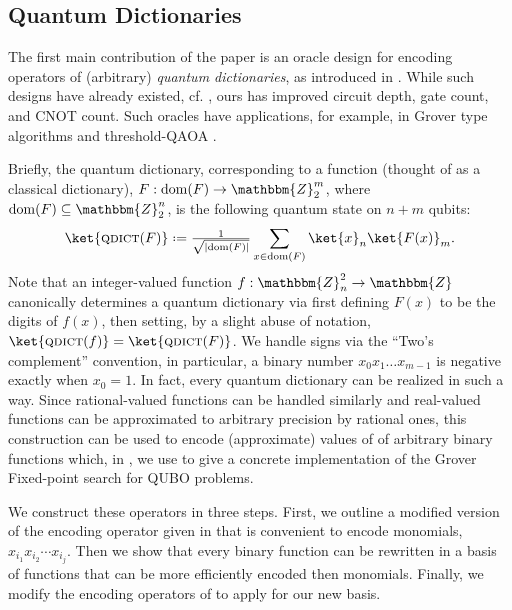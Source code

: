\documentclass[reqno,oneside,12pt]{amsart}  %
\numberwithin{equation}{section}                %
\let\originalleft\left
\let\originalright\right
\renewcommand{\left}{\mathopen{}\mathclose\bgroup\originalleft}
\renewcommand{\right}{\aftergroup\egroup\originalright}
\def\({\mathopen{}\left(}
\def\){\right)\mathclose{}}
\newcommand*{\eqdef}{\mathrel{\vcenter{\baselineskip0.5ex \lineskiplimit0pt\hbox{.}\hbox{.}}}=}
\def\Z{\mathbbm{Z}}
\def\dom{\mathrm{dom}}
\def\qdict{\textsc{qdict}}
\begin{document}
\medskip

\subsection{Quantum Dictionaries}
\label{sec:qdicts}

The first main contribution of the paper is an oracle design for encoding operators of (arbitrary) \emph{quantum dictionaries}, as introduced in \cite{gilliam_foundational_2021}. While such designs have already existed, cf. \cite{gilliam_grover_2021}, ours has improved circuit depth, gate count, and CNOT count. Such oracles have applications, for example, in Grover type algorithms and threshold-QAOA \cite{golden_threshold_2021}.

Briefly, the quantum dictionary, corresponding to a function (thought of as a classical dictionary), $F: \dom \( F \) \rightarrow \Z_2^m$, where $\dom \( F \) \subseteq \Z_2^n$, is the following quantum state on $n + m$ qubits:
\begin{equation}
   \ket{\qdict \( F \)} \eqdef \tfrac{1}{\sqrt{\left| \dom \( F \) \right|}} \sum\limits_{x \in \dom \( F \)} \ket{x}_n \ket{F (x)}_m.
\end{equation}
Note that an integer-valued function $f : \Z_n^2 \rightarrow \Z$ canonically determines a quantum dictionary via first defining $F (x)$ to be the digits of $f (x)$, then setting, by a slight abuse of notation, $\ket{\qdict \( f \)} = \ket{\qdict \( F \)}$. We handle signs via the ``Two's complement'' convention, in particular, a binary number $x_0 x_1 \ldots x_{m - 1}$ is negative exactly when $x_0 = 1$. In fact, every quantum dictionary can be realized in such a way. Since rational-valued functions can be handled similarly and real-valued functions can be approximated to arbitrary precision by rational ones, this construction can be used to encode (approximate) values of of arbitrary binary functions which, in , we use to give a concrete implementation of the Grover Fixed-point search for QUBO problems.

We construct these operators in three steps. First, we outline a modified version of the encoding operator given in \cite{gilliam_grover_2021} that is convenient to encode monomials, $x_{i_1} x_{i_2} \cdots x_{i_j}$. Then we show that every binary function can be rewritten in a basis of functions that can be more efficiently encoded then monomials. Finally, we modify the encoding operators of \cite{gilliam_grover_2021} to apply for our new basis.
\end{document}
